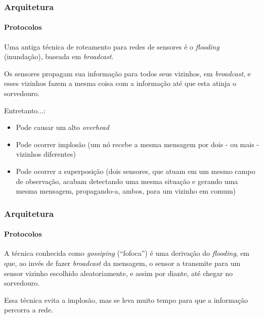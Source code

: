 \documentclass[notes]{beamer}
\begin{document}
\begin{frame}
\frametitle{Arquitetura}
\framesubtitle{Protocolos}

\begin{block}

Uma antiga técnica de roteamento para redes de sensores é o \textit{flooding} (inundação), baseada em \textit{broadcast}. 

\end{block} \pause

\begin{block}

Os sensores propagam sua informação para todos seus vizinhos, em \textit{broadcast}, e esses vizinhos fazem a mesma coisa com a informação até que esta atinja o sorvedouro.

\end{block} \pause

\begin{alertblock}

Entretanto...: 

\begin{itemize}

\item Pode causar um alto \textit{overhead} \pause

\item Pode ocorrer implosão (um nó recebe a mesma mensagem por dois - ou mais - vizinhos diferentes) \pause

\item Pode ocorrer a superposição (dois sensores, que atuam em um mesmo campo de observação, acabam detectando uma mesma situação e gerando uma mesma mensagem, propagando-a, ambos, para um vizinho em comum)

\end{itemize}

\end{alertblock}

\end{frame}

\begin{frame}
\frametitle{Arquitetura}
\framesubtitle{Protocolos}

\begin{block}

A técnica conhecida como \textit{gossiping} (“fofoca”) é uma derivação do \textit{flooding}, em que, ao invés de fazer \textit{broadcast} da mensagem, o sensor a transmite para um sensor vizinho escolhido aleatoriamente, e assim por diante, até chegar no sorvedouro.

\end{block} \pause

\begin{alertblock}

Essa técnica evita a implosão, mas se leva muito tempo para que a informação percorra a rede.  

\end{alertblock}

\end{frame}
\end{document}
